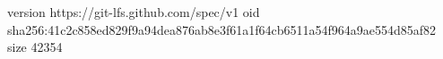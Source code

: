 version https://git-lfs.github.com/spec/v1
oid sha256:41c2c858ed829f9a94dea876ab8e3f61a1f64cb6511a54f964a9ae554d85af82
size 42354
